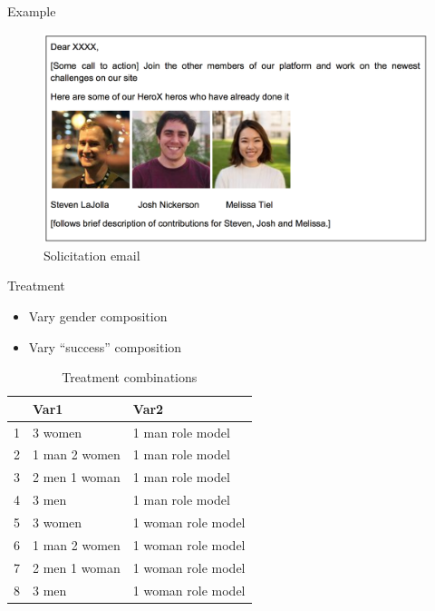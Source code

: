 \begin{frame}{Example}

\begin{figure}
\centering
\includegraphics{solicit_gender_compo.png}
\caption{Solicitation email}
\end{figure}

\end{frame}

\begin{frame}{Treatment}

\begin{itemize}
\tightlist
\item
  Vary gender composition
\item
  Vary ``success'' composition
\end{itemize}

\begin{table}[ht]
\centering
\begin{tabular}{rll}
  \hline
 & Var1 & Var2 \\ 
  \hline
1 & 3 women & 1 man role model \\ 
  2 & 1 man 2 women & 1 man role model \\ 
  3 & 2 men 1 woman & 1 man role model \\ 
  4 & 3 men & 1 man role model \\ 
  5 & 3 women & 1 woman role model \\ 
  6 & 1 man 2 women & 1 woman role model \\ 
  7 & 2 men 1 woman & 1 woman role model \\ 
  8 & 3 men & 1 woman role model \\ 
   \hline
\end{tabular}
\caption{Treatment combinations} 
\end{table}

\end{frame}


